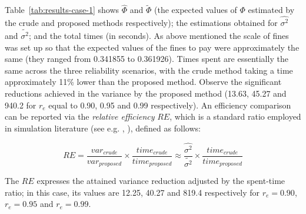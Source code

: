 \documentclass[a4paper]{article}
\begin{document}
Table~\ref{tab:results-case-1} shows $\hat{\Phi}$ and $\tilde{\Phi}$ (the expected values of $\Phi$ estimated by the crude and proposed methods respectively); the estimations obtained for $\widehat{\sigma^2}$ and $\widetilde{\sigma^2}$; and the total times (in seconds). As above mentioned the scale of fines was set up so that the expected values of the fines to pay were approximately the same (they ranged from 0.341855 to 0.361926). Times spent are essentially the same across the three reliability scenarios, with the crude method taking a time approximately 11\% lower than the proposed method. Observe the significant reductions achieved in the variance by the proposed method (13.63, 45.27 and 940.2 for $r_e$ equal to 0.90, 0.95 and 0.99 respectively). An efficiency comparison can be reported via the \emph{relative efficiency}  $RE$, which is a standard ratio employed in simulation literature (see e.g. \cite{Fishman1986}, \cite{rubino2009rare}), defined as follows:

\begin{equation*}
	RE = \frac{\mathit{var}_\mathit{crude}}{\mathit{var}_\mathit{proposed}} \times \frac{\mathit{time}_\mathit{crude}}{\mathit{time}_\mathit{proposed}} \approx \frac{\widehat{\sigma^2}}{\widetilde{\sigma^2}} \times \frac{\mathit{time}_\mathit{crude}}{\mathit{time}_\mathit{proposed}}
\end{equation*}

The $RE$ expresses the attained variance reduction adjusted by the spent-time ratio; in this case, its values are 12.25, 40.27 and 819.4 respectively for $r_e=0.90$, $r_e=0.95$ and $r_e=0.99$.
\end{document}
